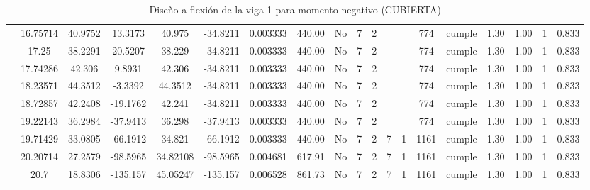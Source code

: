 \begin{table}[H]
{\begin{tabular}{|c|c|c|c|c|c|r|c|c|c|c|c|c|c|c|c|c|c|c|}
\cline{2-19}    & 16.75714 & 40.9752 & 13.3173 & 40.975 & -34.8211 & 0.003333 & 440.00 & No  & 7   & 2   &     &     & 774 & \cellcolor[rgb]{ .776,  .937,  .808}cumple & 1.30 & 1.00 & 1   & 0.833 \bigstrut\\
\cline{2-19}    & 17.25 & 38.2291 & 20.5207 & 38.229 & -34.8211 & 0.003333 & 440.00 & No  & 7   & 2   &     &     & 774 & \cellcolor[rgb]{ .776,  .937,  .808}cumple & 1.30 & 1.00 & 1   & 0.833 \bigstrut\\
\cline{2-19}    & 17.74286 & 42.306 & 9.8931 & 42.306 & -34.8211 & 0.003333 & 440.00 & No  & 7   & 2   &     &     & 774 & \cellcolor[rgb]{ .776,  .937,  .808}cumple & 1.30 & 1.00 & 1   & 0.833 \bigstrut\\
\cline{2-19}    & 18.23571 & 44.3512 & -3.3392 & 44.3512 & -34.8211 & 0.003333 & 440.00 & No  & 7   & 2   &     &     & 774 & \cellcolor[rgb]{ .776,  .937,  .808}cumple & 1.30 & 1.00 & 1   & 0.833 \bigstrut\\
\cline{2-19}    & 18.72857 & 42.2408 & -19.1762 & 42.241 & -34.8211 & 0.003333 & 440.00 & No  & 7   & 2   &     &     & 774 & \cellcolor[rgb]{ .776,  .937,  .808}cumple & 1.30 & 1.00 & 1   & 0.833 \bigstrut\\
\cline{2-19}    & 19.22143 & 36.2984 & -37.9413 & 36.298 & -37.9413 & 0.003333 & 440.00 & No  & 7   & 2   &     &     & 774 & \cellcolor[rgb]{ .776,  .937,  .808}cumple & 1.30 & 1.00 & 1   & 0.833 \bigstrut\\
\cline{2-19}    & 19.71429 & 33.0805 & -66.1912 & 34.821 & -66.1912 & 0.003333 & 440.00 & No  & 7   & 2   & 7   & 1   & 1161 & \cellcolor[rgb]{ .776,  .937,  .808}cumple & 1.30 & 1.00 & 1   & 0.833 \bigstrut\\
\cline{2-19}    & 20.20714 & 27.2579 & -98.5965 & 34.82108 & -98.5965 & 0.004681 & 617.91 & No  & 7   & 2   & 7   & 1   & 1161 & \cellcolor[rgb]{ .776,  .937,  .808}cumple & 1.30 & 1.00 & 1   & 0.833 \bigstrut\\
\cline{2-19}    & 20.7 & 18.8306 & -135.157 & 45.05247 & -135.157 & 0.006528 & 861.73 & No  & 7   & 2   & 7   & 1   & 1161 & \cellcolor[rgb]{ .776,  .937,  .808}cumple & 1.30 & 1.00 & 1   & 0.833 \bigstrut\\
\hline
\end{tabular}%
 
  }
      \caption{Diseño a flexión de la viga 1 para momento negativo (CUBIERTA) }
  \label{tab:F VG1 CUB M-}%
\end{table}%
